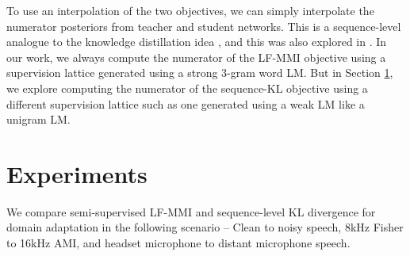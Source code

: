 \documentclass{article}
\begin{document}
To use an interpolation of the two objectives, we can simply interpolate the 
numerator posteriors from teacher and student networks. This is a 
sequence-level analogue to the knowledge distillation idea
\cite{hinton2015distilling}, and this was also explored in
\cite{kanda2018sequence-kl}. In our work, we always 
compute the numerator of the LF-MMI objective using a supervision lattice 
generated using a strong 3-gram word LM. But in Section 
\ref{sec:experiments}, we explore computing the numerator of the sequence-KL
objective using a different supervision lattice such as one generated using
a weak LM like a unigram LM.


\section{Experiments}
\label{sec:experiments}

We compare semi-supervised LF-MMI and sequence-level KL divergence 
for domain adaptation in the following scenario -- Clean to noisy speech, 8kHz
Fisher to 16kHz AMI, and headset microphone to distant microphone speech. 
\end{document}
